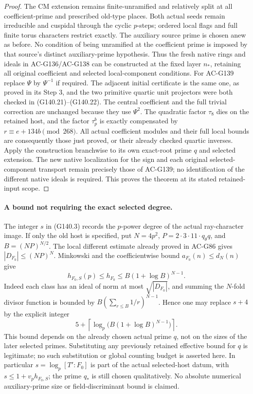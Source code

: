 \begin{proof}
The CM extension remains finite-unramified and relatively
split at all coefficient-prime and prescribed old-type places.
Both actual seeds remain irreducible and cuspidal through the
cyclic $p$-steps; ordered local flags and full finite torus
characters restrict exactly.  The auxiliary source prime is
chosen anew as before.  No condition of being unramified at
the coefficient prime is imposed by that source's distinct
auxiliary-prime hypothesis.  Thus the fresh native rings and
ideals in AC-G136/AC-G138 can be constructed at the fixed
layer $n_*$, retaining all original coefficient and selected
local-component conditions.
For AC-G139 replace $\Psi$ by $\Psi^{-1}$ if required.
The adjacent initial certificate is the same one, as proved in
its Step 3, and the two primitive quartic unit projectors were
both checked in (G140.21)--(G140.22).  The central coefficient and
the full trivial correction are unchanged because they use
$\Psi^2$.  The quadratic factor $\tau_8$ dies on the retained
host, and the factor $\tau_p^b$ is exactly compensated by
$r\equiv e+134b\pmod{268}$.  All actual coefficient modules
and their full local bounds are consequently those just proved,
or their already checked quartic inverses.  Apply the construction
branchwise to its own exact-root prime $q$ and selected extension.
The new native localization for the sign and each original
selected-component transport remain precisely those of AC-G139;
no identification of the different native ideals is required.
This proves the theorem at its stated retained-input scope.
\end{proof}

\paragraph{A bound not requiring the exact selected degree.}
The integer $s$ in (G140.3) records the $p$-power degree of the actual
ray-character image.  If only the old host is specified, put $N=4p^2$,
$P=2\cdot3\cdot11\cdot q_\theta q$, and
$B=(NP)^{N/2}$.  The local different estimate already proved
in AC-G86 gives $|D_{F_0}|\le(NP)^N$.
Minkowski and the coefficientwise bound $a_{F_0}(n)\le d_N(n)$
give
\[
 h_{F_0,S}(p)\le h_{F_0}
       \le B(1+\log B)^{N-1}.
 \tag{G140.32}
\]
Indeed each class has an ideal of norm at most $\sqrt{|D_{F_0}|}$,
and summing the $N$-fold divisor function is bounded by
$B(\sum_{r\le B}1/r)^{N-1}$.
Hence one may replace $s+4$ by the explicit integer
\[
 5+\left\lceil\log_p\bigl(B(1+\log B)^{N-1}\bigr)\right\rceil.
 \tag{G140.33}
\]
This bound depends on the already chosen actual prime $q$,
not on the sizes of the later selected primes.  Substituting
any previously retained effective bound for $q$ is legitimate;
no such substitution or global counting budget is asserted here.
In particular $s=\log_p[T':F_0]$ is part of the actual selected-host
datum, with $s\le1+v_p h_{F_0,S}$; the prime $q_*$ is still chosen
qualitatively.  No absolute numerical auxiliary-prime size or
field-discriminant bound is claimed.

